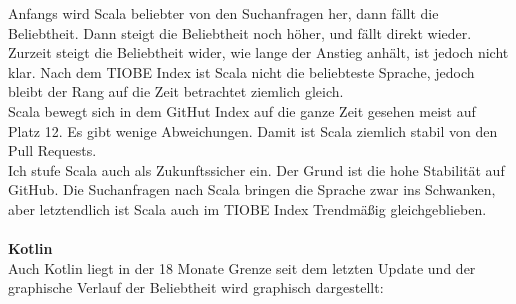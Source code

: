 \documentclass[ngerman]{article}
\begin{document}
    Anfangs wird Scala beliebter von den Suchanfragen her, dann fällt die Beliebtheit. Dann steigt die Beliebtheit noch höher, und fällt direkt wieder. Zurzeit steigt die Beliebtheit wider, wie lange der Anstieg anhält, ist jedoch nicht klar. Nach dem TIOBE Index ist Scala nicht die beliebteste Sprache, jedoch bleibt der Rang auf die Zeit betrachtet ziemlich gleich.\\
    Scala bewegt sich in dem GitHut Index auf die ganze Zeit gesehen meist auf Platz 12. Es gibt wenige Abweichungen. Damit ist Scala ziemlich stabil von den Pull Requests.\\
    Ich stufe Scala auch als Zukunftssicher ein. Der Grund ist die hohe Stabilität auf GitHub. Die Suchanfragen nach Scala bringen die Sprache zwar ins Schwanken, aber letztendlich ist Scala auch im TIOBE Index Trendmäßig gleichgeblieben.\\\\
    \textbf{Kotlin}\\
    Auch Kotlin liegt in der 18 Monate Grenze seit dem letzten Update und der graphische Verlauf der Beliebtheit wird graphisch dargestellt:
\end{document}

